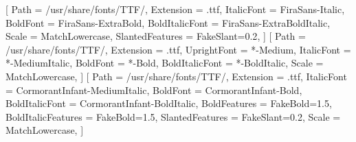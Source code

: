 \setsansfont{FiraSans-Regular}[
    Path                    = /usr/share/fonts/TTF/,
    Extension               = .ttf,
    ItalicFont              = FiraSans-Italic,
    BoldFont                = FiraSans-ExtraBold,
    BoldItalicFont          = FiraSans-ExtraBoldItalic,
    Scale                   = MatchLowercase,
    SlantedFeatures         = {FakeSlant=0.2},
]
\setmonofont{JuliaMono}[
    Path            = /usr/share/fonts/TTF/,
    Extension       = .ttf,
    UprightFont     = *-Medium,
    ItalicFont      = *-MediumItalic,
    BoldFont        = *-Bold,
    BoldItalicFont  = *-BoldItalic,
    Scale           = MatchLowercase,
]
\newfontfamily{}[
    Path                    = /usr/share/fonts/TTF/,
    Extension               = .ttf,
    ItalicFont              = CormorantInfant-MediumItalic,
    BoldFont                = CormorantInfant-Bold,
    BoldItalicFont          = CormorantInfant-BoldItalic,
    BoldFeatures            = {FakeBold=1.5},
    BoldItalicFeatures      = {FakeBold=1.5},
    SlantedFeatures         = {FakeSlant=0.2},
    Scale                   = MatchLowercase,
]
\newcommand{\XXX}[1]{\relax}
\newcommand{\YA}{%
    \mbox{%
        Y\makebox[0pt][l]{\hspace{-0.178em}\raisebox{-0.00ex}{\scalebox{0.30}{E}}}%
        H\makebox[0pt][l]{\hspace{-0.010em}\raisebox{-0.00ex}{\scalebox{0.30}{O}}}%
        W\makebox[0pt][l]{\hspace{-0.245em}\raisebox{-0.00ex}{\scalebox{0.30}{A}}}%
        H%
    }%
}
